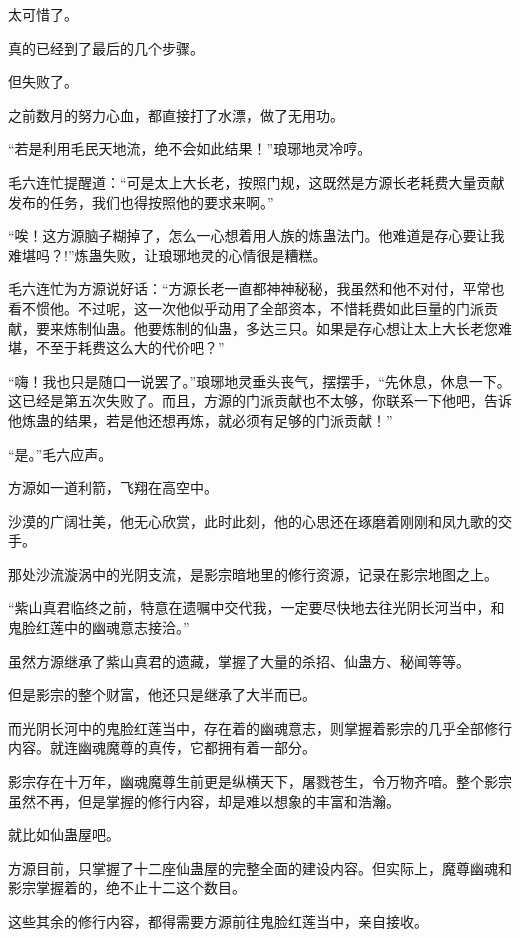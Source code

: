\begin{this_body}
太可惜了。

真的已经到了最后的几个步骤。

但失败了。

之前数月的努力心血，都直接打了水漂，做了无用功。

“若是利用毛民天地流，绝不会如此结果！”琅琊地灵冷哼。

毛六连忙提醒道：“可是太上大长老，按照门规，这既然是方源长老耗费大量贡献发布的任务，我们也得按照他的要求来啊。”

“唉！这方源脑子糊掉了，怎么一心想着用人族的炼蛊法门。他难道是存心要让我难堪吗？!”炼蛊失败，让琅琊地灵的心情很是糟糕。

毛六连忙为方源说好话：“方源长老一直都神神秘秘，我虽然和他不对付，平常也看不惯他。不过呢，这一次他似乎动用了全部资本，不惜耗费如此巨量的门派贡献，要来炼制仙蛊。他要炼制的仙蛊，多达三只。如果是存心想让太上大长老您难堪，不至于耗费这么大的代价吧？”

“嗨！我也只是随口一说罢了。”琅琊地灵垂头丧气，摆摆手，“先休息，休息一下。这已经是第五次失败了。而且，方源的门派贡献也不太够，你联系一下他吧，告诉他炼蛊的结果，若是他还想再炼，就必须有足够的门派贡献！”

“是。”毛六应声。

方源如一道利箭，飞翔在高空中。

沙漠的广阔壮美，他无心欣赏，此时此刻，他的心思还在琢磨着刚刚和凤九歌的交手。

那处沙流漩涡中的光阴支流，是影宗暗地里的修行资源，记录在影宗地图之上。

“紫山真君临终之前，特意在遗嘱中交代我，一定要尽快地去往光阴长河当中，和鬼脸红莲中的幽魂意志接洽。”

虽然方源继承了紫山真君的遗藏，掌握了大量的杀招、仙蛊方、秘闻等等。

但是影宗的整个财富，他还只是继承了大半而已。

而光阴长河中的鬼脸红莲当中，存在着的幽魂意志，则掌握着影宗的几乎全部修行内容。就连幽魂魔尊的真传，它都拥有着一部分。

影宗存在十万年，幽魂魔尊生前更是纵横天下，屠戮苍生，令万物齐喑。整个影宗虽然不再，但是掌握的修行内容，却是难以想象的丰富和浩瀚。

就比如仙蛊屋吧。

方源目前，只掌握了十二座仙蛊屋的完整全面的建设内容。但实际上，魔尊幽魂和影宗掌握着的，绝不止十二这个数目。

这些其余的修行内容，都得需要方源前往鬼脸红莲当中，亲自接收。


\end{this_body}
